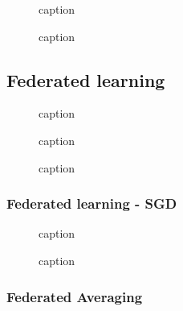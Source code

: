 \documentclass[11pt]{article}
\begin{document}
\begin{figure}[H]
    \centering
    \caption{caption}
\end{figure}

\begin{figure}[H]
    \centering
    \caption{caption}
\end{figure}

\subsection{Federated learning}

\begin{figure}[H]
    \centering
    \caption{caption}
\end{figure}

\begin{figure}[H]
    \centering
    \caption{caption}
\end{figure}

\begin{figure}[H]
    \centering
    \caption{caption}
\end{figure}

\subsubsection{Federated learning - SGD}

\begin{figure}[H]
    \centering
    \caption{caption}
\end{figure}

\begin{figure}[H]
    \centering
    \caption{caption}
\end{figure}

\subsubsection{Federated Averaging}
\end{document}
